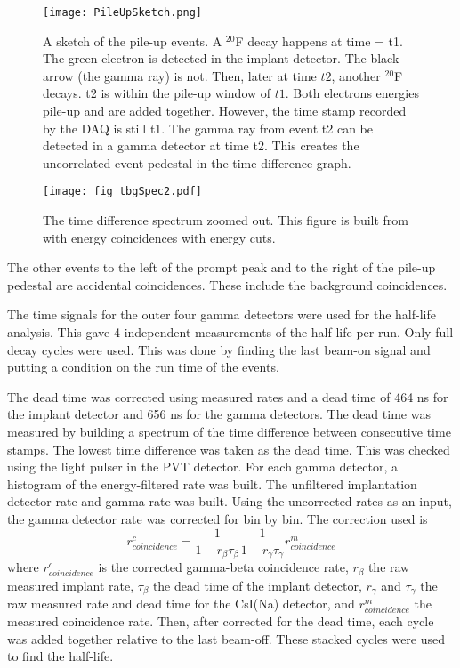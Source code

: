 \documentclass[MaxHughesThesis.tex]{subfiles}
\begin{document}
\begin{figure}
	\centerline{\texttt{[image: PileUpSketch.png]}}
	\caption{A sketch of the pile-up events.
		 A $^{20}$F decay happens at time = t1.
		 The green electron is detected in the implant detector.
		 The black arrow (the gamma ray) is not.
		 Then, later at time $t2$, another $^{20}$F decays.
		 t2 is within the pile-up window of $t1$.
		 Both electrons energies pile-up and are added together.
		 However, the time stamp recorded by the DAQ is still t1.
		 The gamma ray from event t2 can be detected in a gamma detector at time t2.
		 This creates the uncorrelated event pedestal in the time difference graph.
		 }
	\label{fig:PileUp}
\end{figure}

\begin{figure}
	\centerline{\texttt{[image: fig\_tbgSpec2.pdf]}}	
	\caption{The time difference spectrum zoomed out.
		 This figure is built from with energy coincidences with energy cuts.}
	\label{fig:timediff2}
\end{figure}

The other events to the left of the prompt peak and to the right of the pile-up pedestal are accidental coincidences.
These include the background coincidences.

The time signals for the outer four gamma detectors were used for the half-life analysis.
This gave 4 independent measurements of the half-life per run. 
Only full decay cycles were used. 
This was done by finding the last beam-on signal and putting a condition on the run time of the events.

The dead time was corrected using measured rates and a dead time of 464 ns for the implant detector and 656 ns for the gamma detectors.  
The dead time was measured by building a spectrum of the time difference between consecutive time stamps.
The lowest time difference was taken as the dead  time. 
This was checked using the light pulser in the PVT detector.
For each gamma detector, a histogram of the energy-filtered rate was built.
The unfiltered implantation detector rate and gamma rate was built.
Using the uncorrected rates as an input, the gamma detector rate was corrected for bin by bin.
The correction used is 
%
\begin{equation}
r^{c}_{coincidence} = \frac{1}{1 - r_{\beta}\tau_{\beta}}\frac{1}{1 - r_{\gamma}\tau_{\gamma}}r^{m}_{coincidence} 
	\label{eq:dtc} 
\end{equation}
%
where $r^{c}_{coincidence}$ is the corrected gamma-beta coincidence rate, $r_{\beta}$ the raw measured implant rate, $\tau_{\beta}$ the dead time of the implant detector, $r_{\gamma}$ and $\tau_{\gamma}$ the raw measured rate and dead time for the CsI(Na) detector, and $r^{m}_{coincidence}$ the measured coincidence rate.   
Then, after corrected for the dead time, each cycle was added together relative to the last beam-off.
These stacked cycles were used to find the half-life.
\end{document}
